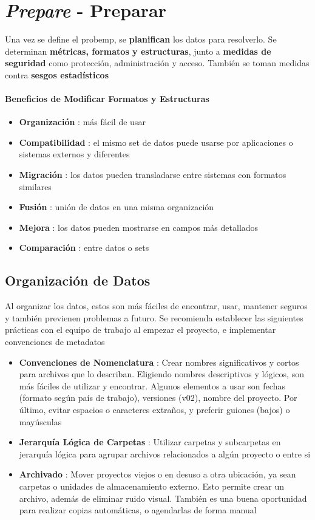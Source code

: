 \section{\textit{Prepare} - Preparar}
Una vez se define el \gls{probemp}, se \textbf{planifican} los datos para resolverlo. Se determinan \textbf{métricas, formatos y estructuras}, junto a \textbf{medidas de seguridad} como protección, administración y acceso. También se toman medidas contra \textbf{sesgos estadísticos}

\paragraph{Beneficios de Modificar Formatos y Estructuras}
\begin{itemize}
    \item {\textbf{Organización} : más fácil de usar}
    \item {\textbf{Compatibilidad} : el mismo set de datos puede usarse por aplicaciones o sistemas externos y diferentes}
    \item {\textbf{Migración} : los datos pueden transladarse entre sistemas con formatos similares}
    \item {\textbf{Fusión} : unión de datos en una misma organización}
    \item {\textbf{Mejora} : los datos pueden mostrarse en campos más detallados}
    \item {\textbf{Comparación} : entre datos o sets}
\end{itemize}

\subsection{Organización de Datos}
Al organizar los datos, estos son más fáciles de encontrar, usar, mantener seguros y también previenen problemas a futuro. Se recomienda establecer las siguientes prácticas con el equipo de trabajo al empezar el proyecto, e implementar convenciones de metadatos
\begin{itemize}
    \item {\textbf{Convenciones de Nomenclatura} : Crear nombres significativos y cortos para archivos que lo describan. Eligiendo nombres descriptivos y lógicos, son más fáciles de utilizar y encontrar. Algunos elementos a usar son fechas (formato según país de trabajo), versiones (v02), nombre del proyecto. Por último, evitar espacios o caracteres extraños, y preferir guiones (bajos) o mayúsculas}
    \item {\textbf{Jerarquía Lógica de Carpetas} : Utilizar carpetas y subcarpetas en jerarquía lógica para agrupar archivos relacionados a algún proyecto o entre si}
    \item {\textbf{Archivado} : Mover proyectos viejos o en desuso a otra ubicación, ya sean carpetas o unidades de almacenamiento externo. Esto permite crear un archivo, además de eliminar ruido visual. También es una buena oportunidad para realizar copias automáticas, o agendarlas de forma manual}
\end{itemize}

